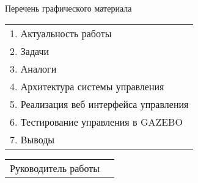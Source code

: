 \newpage

\thispagestyle{empty}

\begin{center}
    Перечень графического материала
\end{center}

\noindent
\begin{tabularx}{\linewidth}{X}
    1. Актуальность работы \\
    2. Задачи \\
    3. Аналоги \\
    4. Архитектура системы управления \\
    5. Реализация веб интерфейса управления \\
    6. Тестирование управления в GAZEBO \\
    7. Выводы \\
\end{tabularx}

\bigskip

\noindent
\begin{tabularx}{\linewidth}{@{}lP@{}}
    Руководитель работы  & 
\end{tabularx}

\bigskip
\bigskip

\newpage
\pagestyle{plain}